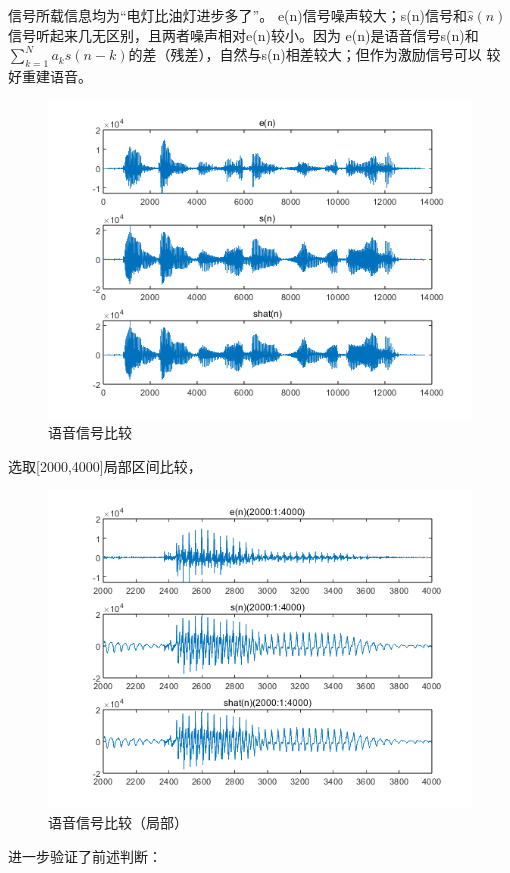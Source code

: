 \documentclass[10pt]{article}
\begin{document}
信号所载信息均为“电灯比油灯进步多了”。
e(n)信号噪声较大；s(n)信号和$\hat{s}(n)$信号听起来几无区别，且两者噪声相对e(n)较小。因为
e(n)是语音信号s(n)和$\sum_{k=1}^{N}a_ks(n-k)$的差（残差），自然与s(n)相差较大；但作为激励信号可以
较好重建语音。
\begin{figure}[h]
	\centering
	\begin{minipage}{0.49\linewidth}
		\centering
		\includegraphics[width=0.9\linewidth]{compare.png}
		\caption{语音信号比较}
	\end{minipage}
\end{figure}

选取[2000,4000]局部区间比较，
\begin{figure}[h]
	\centering
	\begin{minipage}{0.49\linewidth}
		\centering
		\includegraphics[width=0.9\linewidth]{commpare.png}
		\caption{语音信号比较（局部）}
	\end{minipage}
\end{figure}
进一步验证了前述判断：
\end{document}
